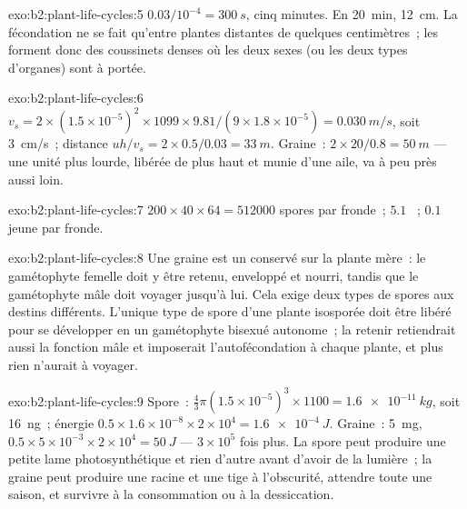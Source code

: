 \begin{solution}{exo:b2:plant-life-cycles:5}
$0.03/10^{-4} = \qty{300}{s}$, cinq minutes. En \qty{20}{min},
\qty{12}{cm}. La fécondation ne se fait qu'entre plantes distantes de
quelques centimètres~; les  forment donc des coussinets denses
où les deux sexes (ou les deux types d'organes) sont à portée.
\end{solution}

\begin{solution}{exo:b2:plant-life-cycles:6}
$v_s = 2\times(1.5\times 10^{-5})^2\times 1099\times 9.81/(9\times
1.8\times 10^{-5}) = \qty{0.030}{m/s}$, soit \qty{3}{cm/s}~; distance
$uh/v_s
= 2\times 0.5/0.03 = \qty{33}{m}$. Graine~: $2\times 20/0.8 =
\qty{50}{m}$ --- une unité plus lourde, libérée de plus haut et munie
d'une aile, va à peu près aussi loin.
\end{solution}

\begin{solution}{exo:b2:plant-life-cycles:7}
$200\times 40\times 64 = \num{512000}$ spores par fronde~; $5.1$
~; $0.1$ jeune  par fronde.
\end{solution}

\begin{solution}{exo:b2:plant-life-cycles:8}
Une graine est un  conservé sur la plante mère~: le gamétophyte
femelle doit y être retenu, enveloppé et nourri, tandis que le
gamétophyte mâle doit voyager jusqu'à lui. Cela exige deux types de
spores aux destins différents. L'unique type de spore d'une plante
isosporée doit être libéré pour se développer en un gamétophyte
bisexué autonome~; la retenir retiendrait aussi la fonction mâle et
imposerait l'autofécondation à chaque plante, et plus rien n'aurait à
voyager.
\end{solution}

\begin{solution}{exo:b2:plant-life-cycles:9}
Spore~: $\tfrac43\pi(1.5\times 10^{-5})^3\times 1100 =
\qty{1.6e-11}{kg}$, soit \qty{16}{ng}~; énergie $0.5\times 1.6\times
10^{-8}\times 2\times 10^{4} = \qty{1.6e-4}{J}$. Graine~: \qty{5}{mg},
$0.5\times 5\times 10^{-3}\times 2\times 10^{4} = \qty{50}{J}$ ---
$3\times 10^{5}$ fois plus. La spore peut produire une petite lame
photosynthétique et rien d'autre avant d'avoir de la lumière~; la graine
peut produire une racine et une tige à l'obscurité, attendre toute une
saison, et survivre à la consommation ou à la dessiccation.
\end{solution}


